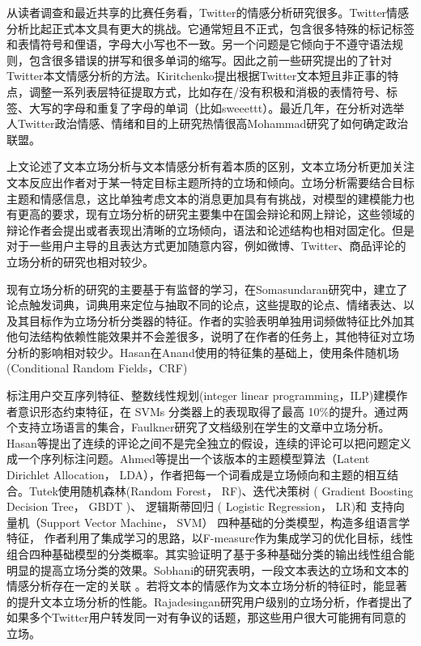 从读者调查和最近共享的比赛任务看，Twitter的情感分析研究很多。Twitter情感分析比起正式本文具有更大的挑战。它通常短且不正式，包含很多特殊的标记标签和表情符号和俚语，字母大小写也不一致。另一个问题是它倾向于不遵守语法规则，包含很多错误的拼写和很多单词的缩写。因此之前一些研究提出的了针对Twitter本文情感分析的方法。Kiritchenko\cite{kiritchenko2014sentiment}提出根据Twitter文本短且非正事的特点，调整一系列表层特征提取方式，比如存在/没有积极和消极的表情符号、标签、大写的字母和重复了字母的单词（比如sweeettt）。最近几年，在分析对选举人Twitter政治情感、情绪和目的上研究热情很高Mohammad\cite{mohammad2015sentiment}研究了如何确定政治联盟。


上文论述了文本立场分析与文本情感分析有着本质的区别，文本立场分析更加关注文本反应出作者对于某一特定目标主题所持的立场和倾向。立场分析需要结合目标主题和情感信息，这比单独考虑文本的消息更加具有有挑战，对模型的建模能力也有更高的要求，现有立场分析的研究主要集中在国会辩论和网上辩论，这些领域的辩论作者会提出或者表现出清晰的立场倾向，语法和论述结构也相对固定化。但是对于一些用户主导的且表达方式更加随意内容，例如微博、Twitter、商品评论的立场分析的研究也相对较少。

现有立场分析的研究的主要基于有监督的学习，在Somasundaran\cite{somasundaran2009recognizing}研究中，建立了论点触发词典，词典用来定位与抽取不同的论点，这些提取的论点、情绪表达、以及其目标作为立场分析分类器的特征。作者的实验表明单独用词频做特征比外加其他句法结构依赖性能效果并不会差很多，说明了在作者的任务上，其他特征对立场分析的影响相对较少。Hasan\cite{hasan2013stance}在Anand使用的特征集的基础上，使用条件随机场(Conditional Random Fields，CRF)

标注用户交互序列特征、整数线性规划(integer linear programming，ILP)建模作者意识形态约束特征，在 SVMs 分类器上的表现取得了最高 10\%的提升。通过两个支持立场语言的集合，Faulkner\cite{faulkner2014automated}研究了文档级别在学生的文章中立场分析。Hasan\cite{hasan2013stance}等提出了连续的评论之间不是完全独立的假设，连续的评论可以把问题定义成一个序列标注问题。Ahmed\cite{ahmed2010staying}等提出一个该版本的主题模型算法（Latent Dirichlet Allocation， LDA），作者把每一个词看成是立场倾向和主题的相互结合。Tutek使用随机森林(Random Forest， RF)、迭代决策树 ( Gradient Boosting Decision Tree， GBDT )、 逻辑斯蒂回归 ( Logistic Regression， LR)和 支持向量机（Support Vector Machine， SVM） 四种基础的分类模型，构造多组语言学特征， 作者利用了集成学习的思路，以F-measure作为集成学习的优化目标，线性组合四种基础模型的分类概率。其实验证明了基于多种基础分类的输出线性组合能明显的提高立场分类的效果。Sobhani的研究表明，一段文本表达的立场和文本的情感分析存在一定的关联 。若将文本的情感作为文本立场分析的特征时，能显著的提升文本立场分析的性能。Rajadesingan\cite{rajadesingan2014identifying}研究用户级别的立场分析，作者提出了如果多个Twitter用户转发同一对有争议的话题，那这些用户很大可能拥有同意的立场。

